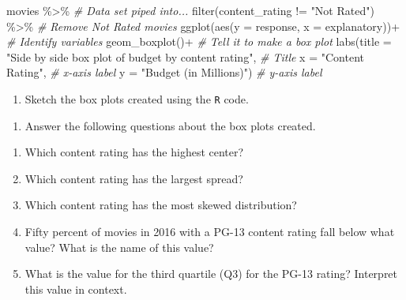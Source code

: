 \documentclass[
]{report}
\newenvironment{Shaded}{\begin{snugshade}}{\end{snugshade}}
\newcommand{\AttributeTok}[1]{\textcolor[rgb]{0.77,0.63,0.00}{#1}}
\newcommand{\CommentTok}[1]{\textcolor[rgb]{0.56,0.35,0.01}{\textit{#1}}}
\newcommand{\FunctionTok}[1]{\textcolor[rgb]{0.00,0.00,0.00}{#1}}
\newcommand{\NormalTok}[1]{#1}
\newcommand{\SpecialCharTok}[1]{\textcolor[rgb]{0.00,0.00,0.00}{#1}}
\newcommand{\StringTok}[1]{\textcolor[rgb]{0.31,0.60,0.02}{#1}}
\providecommand{\tightlist}{%
  \setlength{\itemsep}{0pt}\setlength{\parskip}{0pt}}
\begin{document}
\begin{Shaded}
\begin{Highlighting}[]
\NormalTok{movies }\SpecialCharTok{\%\textgreater{}\%}  \CommentTok{\# Data set piped into...}
  \FunctionTok{filter}\NormalTok{(content\_rating }\SpecialCharTok{!=} \StringTok{"Not Rated"}\NormalTok{) }\SpecialCharTok{\%\textgreater{}\%} \CommentTok{\# Remove Not Rated movies}
  \FunctionTok{ggplot}\NormalTok{(}\FunctionTok{aes}\NormalTok{(}\AttributeTok{y =}\NormalTok{ response, }\AttributeTok{x =}\NormalTok{ explanatory))}\SpecialCharTok{+}  \CommentTok{\# Identify variables}
  \FunctionTok{geom\_boxplot}\NormalTok{()}\SpecialCharTok{+}  \CommentTok{\# Tell it to make a box plot}
  \FunctionTok{labs}\NormalTok{(}\AttributeTok{title =} \StringTok{"Side by side box plot of budget by content rating"}\NormalTok{,  }\CommentTok{\# Title}
       \AttributeTok{x =} \StringTok{"Content Rating"}\NormalTok{,    }\CommentTok{\# x{-}axis label}
       \AttributeTok{y =} \StringTok{"Budget (in Millions)"}\NormalTok{)  }\CommentTok{\# y{-}axis label}
\end{Highlighting}
\end{Shaded}

\begin{enumerate}
\def\labelenumi{\arabic{enumi}.}
\setcounter{enumi}{14}
\tightlist
\item
  Sketch the box plots created using the \texttt{R} code.
\end{enumerate}

\vspace{1.5in}

\begin{enumerate}
\def\labelenumi{\arabic{enumi}.}
\setcounter{enumi}{15}
\tightlist
\item
  Answer the following questions about the box plots created.
\end{enumerate}

\begin{enumerate}
\def\labelenumi{\alph{enumi}.}
\item
  Which content rating has the highest center?
  \vspace{0.2in}
\item
  Which content rating has the largest spread?
  \vspace{0.2in}
\item
  Which content rating has the most skewed distribution?
  \vspace{0.2in}
\item
  Fifty percent of movies in 2016 with a PG-13 content rating fall below what value? What is the name of this value?
  \vspace{0.4in}
\item
  What is the value for the third quartile (Q3) for the PG-13 rating? Interpret this value in context.
  \vspace{.8in}
\end{enumerate}
\end{document}
